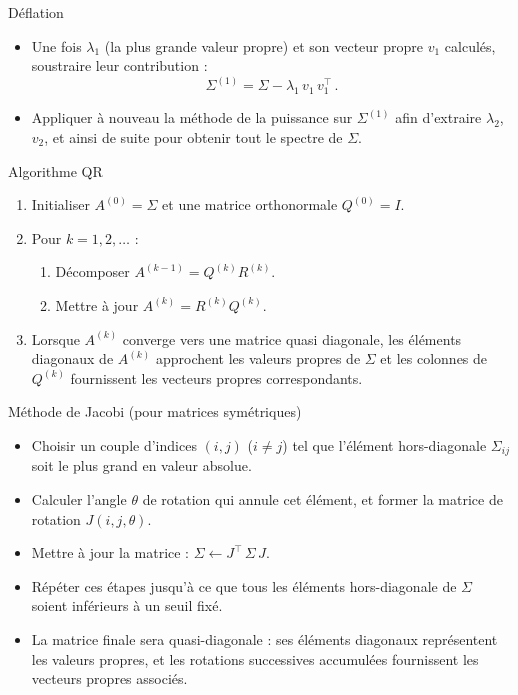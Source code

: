 \documentclass{beamer}
\begin{document}
\begin{frame}{Déflation}
\small
\begin{itemize}
    \item Une fois $\lambda_1$ (la plus grande valeur propre) et son vecteur propre $v_1$ calculés, soustraire leur contribution : 
    \[
    \Sigma^{(1)} = \Sigma - \lambda_1\, v_1\, v_1^\top\,.
    \]
    \item Appliquer à nouveau la méthode de la puissance sur $\Sigma^{(1)}$ afin d'extraire $\lambda_2$, $v_2$, et ainsi de suite pour obtenir tout le spectre de $\Sigma$.
\end{itemize}
\end{frame}

\begin{frame}{Algorithme QR}
\small
\begin{enumerate}
    \item Initialiser $A^{(0)} = \Sigma$ et une matrice orthonormale $Q^{(0)} = I$.
    \item Pour $k = 1,2,\ldots$ :
    \begin{enumerate}
        \item Décomposer $A^{(k-1)} = Q^{(k)} R^{(k)}$.
        \item Mettre à jour $A^{(k)} = R^{(k)} Q^{(k)}$.
    \end{enumerate}
    \item Lorsque $A^{(k)}$ converge vers une matrice quasi diagonale, les éléments diagonaux de $A^{(k)}$ approchent les valeurs propres de $\Sigma$ et les colonnes de $Q^{(k)}$ fournissent les vecteurs propres correspondants.
\end{enumerate}
\end{frame}

\begin{frame}{Méthode de Jacobi (pour matrices symétriques)}
\small
\begin{itemize}
    \item Choisir un couple d'indices $(i,j)$ ($i \neq j$) tel que l'élément hors-diagonale $\Sigma_{ij}$ soit le plus grand en valeur absolue.
    \item Calculer l'angle $\theta$ de rotation qui annule cet élément, et former la matrice de rotation $J(i,j,\theta)$.
    \item Mettre à jour la matrice : $\Sigma \leftarrow J^\top\, \Sigma\, J$.
    \item Répéter ces étapes jusqu'à ce que tous les éléments hors-diagonale de $\Sigma$ soient inférieurs à un seuil fixé.
    \item La matrice finale sera quasi-diagonale : ses éléments diagonaux représentent les valeurs propres, et les rotations successives accumulées fournissent les vecteurs propres associés.
\end{itemize}
\end{frame}
\end{document}

